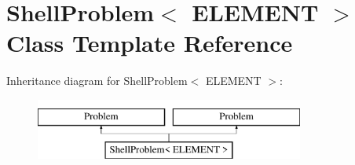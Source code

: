 \hypertarget{classShellProblem}{}\section{Shell\+Problem$<$ E\+L\+E\+M\+E\+NT $>$ Class Template Reference}
\label{classShellProblem}
Inheritance diagram for Shell\+Problem$<$ E\+L\+E\+M\+E\+NT $>$\+:\begin{figure}[H]
\begin{center}
\leavevmode
\includegraphics[height=2.000000cm]{classShellProblem}
\end{center}
\end{figure}
